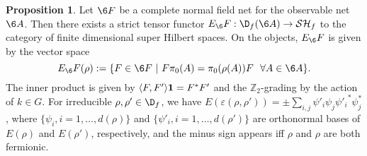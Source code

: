 \documentclass[12pt]{article}
\theoremstyle{definition}
\newtheorem{prop}[thm]{Proposition}
\theoremstyle{definition}
\theoremstyle{remark}
\newcommand{\ve}{\varepsilon}
\def\2#1{{\mathcal #1}}
\def\7#1{{\mathbb #1}}
\def\1#1{{\bf #1}}
\newcommand{\rarr}{\rightarrow}
\begin{document}
\begin{prop}  \label{prop-FtoE}
Let $\6F$ be a complete normal field net for the observable net $\6A$. Then there exists a strict
tensor functor $E_\6F:\D_f(\6A)\rarr\2S\2H_f$ to the category of finite dimensional super Hilbert
spaces. On the objects, $E_\6F$ is given by the vector space 
\[ E_\6F(\rho):=\{ F\in\6F\ | \ F\pi_0(A)=\pi_0(\rho(A))F \ \ \forall A\in\6A\}. \]
The inner product is given by $\langle F,F'\rangle\11=F^*F'$ and the $\7Z_2$-grading by the action
of $k\in G$. For irreducible $\rho,\rho'\in\D_f$,
we have $E(\ve(\rho,\rho'))=\pm \sum_{i,j}\psi'_i\psi_j{\psi'_i}^*\psi_j^*$,
where  $\{\psi_i, i=1,\ldots,d(\rho)\}$ and $\{\psi'_i, i=1,\ldots,d(\rho')\}$ are orthonormal
bases of $E(\rho)$ and $E(\rho')$, respectively, and the minus sign appears iff $\rho$ and $\rho$
are both fermionic. 
\end{prop}
\end{document}

